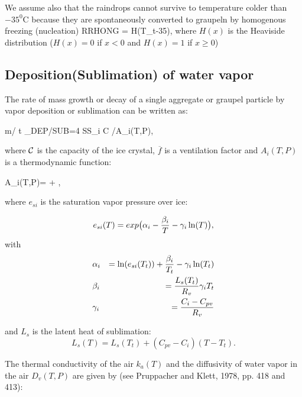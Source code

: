 We assume also that the raindrops cannot survive to temperature colder than
$-35^{0}$C because they are spontaneously converted to graupeln by homogenous
freezing (nucleation)
%
\be\label{HOM5}
RRHONG =  H(T_t-35),
\ee
\noindent where $H(x)$ is the Heaviside distribution ($H(x)=0$ if $x<0$ and
$H(x)=1$ if $x \ge 0$)


%
\subsection{Deposition(Sublimation) of water vapor}
%

The rate of mass growth or decay of a single aggregate or graupel particle by
vapor deposition or sublimation can be written as:

%
\be\label{DEP1}
\partial m/ \partial t \mid_{DEP/SUB}=4 \pi SS_i {\cal C}  /A_{i}(T,P),
\ee
%

\noindent where $\cal C$ is the capacity of the ice crystal, $\overline{f}$ is a
ventilation factor and $A_{i}(T,P)$ is a thermodynamic function:

%
\be\label{DEP2}
A_{i}(T,P)=  +
        ,
\ee
%

\noindent where $e_{si}$ is the saturation vapor pressure over ice:

\begin{equation}
e_{si}(T)= exp \big( \alpha_i - {\beta_i \over T} - \gamma_i \ln (T) \big),
\end{equation}
with
\begin{eqnarray}
&\alpha_i   &= \ln (e_{si}(T_t))+{\beta_i \over T_t} - \gamma_i \ln (T_t) \\
&\beta_i   &= {L_s(T_t) \over R_v}\gamma_i T_t \\
&\gamma_i  &= {C_i -C_{pv} \over R_v}
\end{eqnarray}

\noindent and $L_s$ is the latent heat of sublimation:
\begin{equation}
L_s(T) = L_s(T_t) + (C_{pv} - C_i)(T-T_t).
\end{equation}

\noindent The thermal conductivity of the air $k_{a}(T)$ and the diffusivity of
water vapor in the air $D_{v}(T,P)$ are given by (see Pruppacher and Klett, 1978, pp. 418 and 413):


